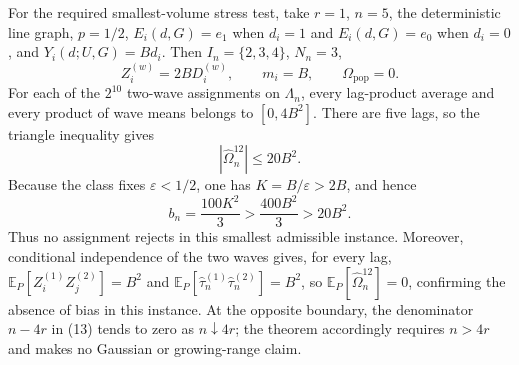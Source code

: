 For the required smallest-volume stress test, take \(r=1\), \(n=5\), the deterministic line graph, \(p=1/2\), \(E_i(d,G)=e_1\) when \(d_i=1\) and \(E_i(d,G)=e_0\) when \(d_i=0\), and \(Y_i(d;U,G)=Bd_i\).  Then \(I_n=\{2,3,4\}\), \(N_n=3\),
\[
 Z_i^{(w)}=2BD_i^{(w)},
 \qquad m_i=B,
 \qquad \Omega_{\mathrm{pop}}=0. \tag{15}
\]
For each of the \(2^{10}\) two-wave assignments on \(\Lambda_n\), every lag-product average and every product of wave means belongs to \([0,4B^2]\).  There are five lags, so the triangle inequality gives
\[
 |\widehat\Omega_n^{12}|\le 20B^2. \tag{16}
\]
Because the class fixes \(\varepsilon<1/2\), one has \(K=B/\varepsilon>2B\), and hence
\[
 b_n=\frac{100K^2}{3}>\frac{400B^2}{3}>20B^2. \tag{17}
\]
Thus no assignment rejects in this smallest admissible instance.  Moreover, conditional independence of the two waves gives, for every lag, \(\mathbb E_P[Z_i^{(1)}Z_j^{(2)}]=B^2\) and \(\mathbb E_P[\widehat\tau_n^{(1)}\widehat\tau_n^{(2)}]=B^2\), so \(\mathbb E_P[\widehat\Omega_n^{12}]=0\), confirming the absence of bias in this instance.  At the opposite boundary, the denominator \(n-4r\) in (13) tends to zero as \(n\downarrow4r\); the theorem accordingly requires \(n>4r\) and makes no Gaussian or growing-range claim.
